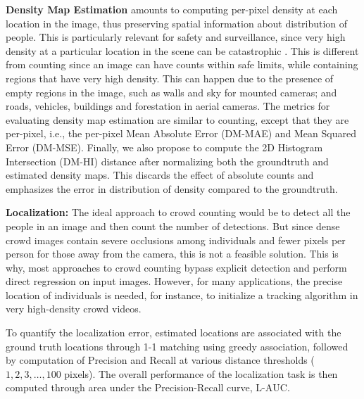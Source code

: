 \documentclass[runningheads]{llncs}
\begin{document}
\smallskip
\noindent\textbf{Density Map Estimation} amounts to computing per-pixel density at each location in the image, thus preserving spatial information about distribution of people. This is particularly relevant for safety and surveillance, since very high density at a particular location in the scene can be catastrophic \cite{guardian_hajj_2006}. This is different from counting since an image can have counts within safe limits, while containing regions that have very high density. This can happen due to the presence of empty regions in the image, such as walls and sky for mounted cameras; and roads, vehicles, buildings and forestation in aerial cameras. The metrics for evaluating density map estimation are similar to counting, except that they are per-pixel, i.e., the per-pixel Mean Absolute Error (DM-MAE) and Mean Squared Error (DM-MSE). Finally, we also propose to compute the 2D Histogram Intersection (DM-HI) distance after normalizing both the groundtruth and estimated density maps. This discards the effect of absolute counts and emphasizes the error in distribution of density compared to the groundtruth. 

\begin{comment}
This is given by,
\begin{multline}
\textrm{DM-HI} = \frac{1}{|\mathbf{I}|} \sum_{i \in \mathbf{I}}\sum_{j,k} \\
{\mathrm{min} \bigg(
\frac{\hat{\mathbf{d}}_i(j,k)}{\sum_{j',k'}\hat{\mathbf{d}}_i(j',k')},
\frac{\mathbf{d}_i(j,k)}{\sum_{j',k'} \mathbf{d}_i(j',k')}\bigg)}. \\
\end{multline}
\end{comment}

\smallskip
\noindent\textbf{Localization:} The ideal approach to crowd counting would be to detect all the people in an image and then count the number of detections. But since dense crowd images contain severe occlusions among individuals and fewer pixels per person for those away from the camera, this is not a feasible solution. This is why, most approaches to crowd counting bypass explicit detection and perform direct regression on input images. However, for many applications, the precise location of individuals is needed, for instance, to initialize a tracking algorithm in very high-density crowd videos.




To quantify the localization error, estimated locations are associated with the ground truth locations through 1-1 matching using greedy association, followed by computation of Precision and Recall at various distance thresholds ($1,2,3, \ldots, 100$ pixels). The overall performance of the localization task is then computed through area under the Precision-Recall curve, $\textrm{L-AUC}$.  
\end{document}
